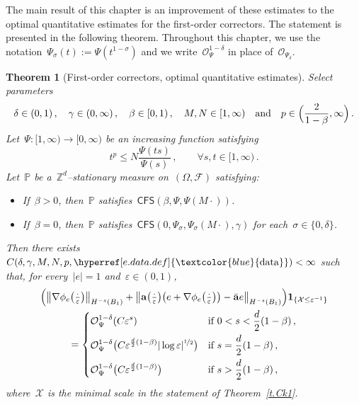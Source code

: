 \documentclass[11pt,twoside]{article} %
\numberwithin{equation}{section}
\newtheorem{theorem}{Theorem}[section]
\theoremstyle{definition}
\newcommand{\dataref}{\hyperref[e.data.def]{\textcolor{blue}{\ensuremath{\mathrm{data}}}}}
\let\originalleft\left
\let\originalright\right
\renewcommand{\left}{\mathopen{}\mathclose\bgroup\originalleft}
\renewcommand{\right}{\aftergroup\egroup\originalright}
\newcommand*{\Zd}{\ensuremath{\mathbb{Z}^d}}
\newcommand{\eps}{\varepsilon}
\newcommand{\ep}{\eps}
\renewcommand{\a}{\mathbf{a}}
\newcommand{\ahom}{\bar{\a}}
\newcommand{\F}{\mathcal{F}}
\renewcommand{\P}{\mathbb{P}}
\newcommand{\X}{\mathcal{X}}
\renewcommand{\O}{\mathcal{O}}
\newcommand{\indc}{\boldsymbol{1}}
\newcommand{\CFS}{\mathsf{CFS}}
\begin{document}
\smallskip

The main result of this chapter is an improvement of these estimates to the optimal quantitative estimates for the first-order correctors. The statement is presented in the  following theorem. Throughout this chapter, we use the notation~$\Psi_\sigma(t) := \Psi(t^{1-\sigma})$ and we write~$\O^{1-\delta}_\Psi$ in place of~$\O_{\Psi_\delta}$. 

\begin{theorem}[First-order correctors, optimal quantitative estimates]
\label{t.corr.optimal}
Select parameters
\begin{equation*}
\delta \in (0,1)\,, \quad \gamma \in (0,\infty) 
\,, \quad 
\beta \in [0,1)
\,, \quad 
M, N \in [1,\infty)
\quad \mbox{and} \quad
p \in \Bigl(\frac{2}{1-\beta},\infty\Bigr)\,.
\end{equation*}
Let~$\Psi:[1,\infty) \to [0,\infty)$ be an increasing function satisfying
\begin{equation}  
\label{e.Psi.pgrowth.theorem.corr}
t^p \leq N \frac{\Psi(t s)}{\Psi(s)} 
\,, \qquad  
\forall 
s, t \in [1,\infty)
\,. 
\end{equation}
Let~$\P$ be a~$\Zd$--stationary measure on~$(\Omega,\F)$ satisfying: 
\begin{itemize}
\item If~$\beta >0$, then~$\P$ satisfies~$\CFS(\beta,\Psi,\Psi(M\cdot))$.
\item If~$\beta = 0$, then~$\P$ satisfies~$\CFS(0,\Psi_\sigma,\Psi_\sigma(M\cdot),\gamma)$ for each~$\sigma \in \{0,\delta\}$.
\end{itemize}
Then there exists~$C(\delta,\gamma,M,N,p,\dataref) < \infty$ such that, for every~$|e|=1$ and~$\ep \in (0,1)$, 
\begin{multline}
\label{e.corr.bounds}
\Big( \big\| \nabla \phi_e\bigl( \tfrac{\cdot}{\ep} \bigr)  \bigr\|_{H^{-s}(B_1)}  + \big\| \a\bigl( \tfrac{\cdot}{\ep} \bigr)\bigl( e + \nabla \phi_e\bigl( \tfrac{\cdot}{\ep} \bigr) \bigr) - \ahom e \bigr\|_{H^{-s}(B_1)} \Big)\indc_{\{ \X \leq \ep^{-1} \}} 
\\
= 
\left\{
\begin{aligned}
& \O_{\Psi}^{1-\delta} (C \ep^s) & \mbox{if} & \ 0 < s < \frac{d}{2}(1-\beta)\,,\\
&\O_{\Psi}^{1-\delta}  \bigl( C \ep^{\frac d2(1-\beta)} | \log \ep|^{\nicefrac12} \bigr) & \mbox{if} & \ s = \frac{d}{2}(1-\beta) \,, \\
&\O_{\Psi}^{1-\delta} \bigl( C \ep^{\frac d2(1-\beta)} \bigr) & \mbox{if} & \ s > \frac{d}{2}(1-\beta) \,,
\end{aligned}
\right.
\end{multline}
where~$\X$ is the minimal scale in the statement of Theorem~\ref{t.Ck1}.
\end{theorem}
\end{document}
